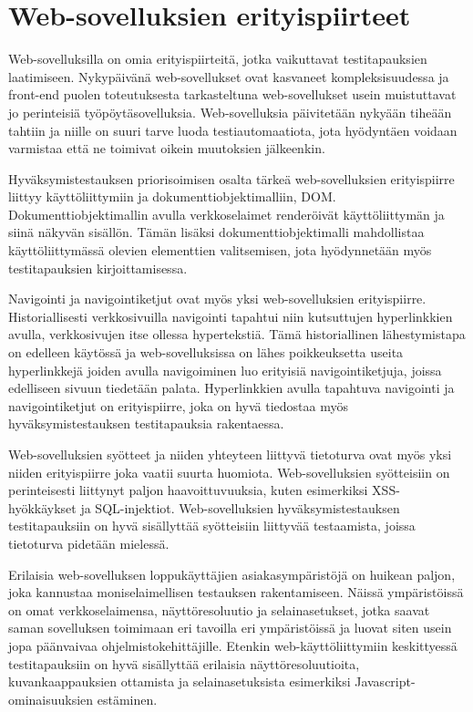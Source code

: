 \section{Web-sovelluksien erityispiirteet} \label{ch:08_websovelluksien_erityispiirteet}

  Web-sovelluksilla on omia erityispiirteitä, jotka vaikuttavat testitapauksien laatimiseen.
  Nykypäivänä web-sovellukset ovat kasvaneet kompleksisuudessa ja front-end puolen toteutuksesta tarkasteltuna web-sovellukset usein muistuttavat jo perinteisiä työpöytäsovelluksia.
  Web-sovelluksia päivitetään nykyään tiheään tahtiin ja niille on suuri tarve luoda testiautomaatiota, jota hyödyntäen voidaan varmistaa että ne toimivat oikein muutoksien jälkeenkin.

  Hyväksymistestauksen priorisoimisen osalta tärkeä web-sovelluksien erityispiirre liittyy käyttöliittymiin ja dokumenttiobjektimalliin, DOM.
  Dokumenttiobjektimallin avulla verkkoselaimet renderöivät käyttöliittymän ja siinä näkyvän sisällön.
  Tämän lisäksi dokumenttiobjektimalli mahdollistaa käyttöliittymässä olevien elementtien valitsemisen, jota hyödynnetään myös testitapauksien kirjoittamisessa.

  Navigointi ja navigointiketjut ovat myös yksi web-sovelluksien erityispiirre.
  Historiallisesti verkkosivuilla navigointi tapahtui niin kutsuttujen hyperlinkkien avulla, verkkosivujen itse ollessa hypertekstiä.
  Tämä historiallinen lähestymistapa on edelleen käytössä ja web-sovelluksissa on lähes poikkeuksetta useita hyperlinkkejä joiden avulla navigoiminen luo erityisiä navigointiketjuja, joissa edelliseen sivuun tiedetään palata.
  Hyperlinkkien avulla tapahtuva navigointi ja navigointiketjut on erityispiirre, joka on hyvä tiedostaa myös hyväksymistestauksen testitapauksia rakentaessa.

  Web-sovelluksien syötteet ja niiden yhteyteen liittyvä tietoturva ovat myös yksi niiden erityispiirre joka vaatii suurta huomiota.
  Web-sovelluksien syötteisiin on perinteisesti liittynyt paljon haavoittuvuuksia, kuten esimerkiksi XSS-hyökkäykset ja SQL-injektiot.
  Web-sovelluksien hyväksymistestauksen testitapauksiin on hyvä sisällyttää syötteisiin liittyvää testaamista, joissa tietoturva pidetään mielessä.

  Erilaisia web-sovelluksen loppukäyttäjien asiakasympäristöjä on huikean paljon, joka kannustaa moniselaimellisen testauksen rakentamiseen.
  Näissä ympäristöissä on omat verkkoselaimensa, näyttöresoluutio ja selainasetukset, jotka saavat saman sovelluksen toimimaan eri tavoilla eri ympäristöissä ja luovat siten usein jopa päänvaivaa ohjelmistokehittäjille.
  Etenkin web-käyttöliittymiin keskittyessä testitapauksiin on hyvä sisällyttää erilaisia näyttöresoluutioita, kuvankaappauksien ottamista ja selainasetuksista esimerkiksi Javascript-ominaisuuksien estäminen.

